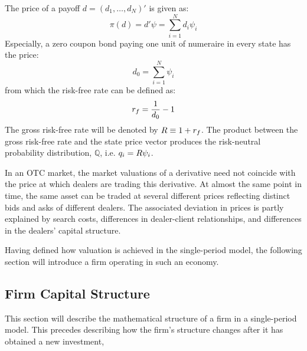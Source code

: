 \documentclass[main.tex]{subfiles}
\begin{document}
        The price of a payoff $d=\left(d_{1}, \dots, d_{N}\right)'$ is given as:
            \begin{equation*}
                \pi(d) = d'\psi = \sum_{i=1}^{N} d_{i}\psi_{i}
            \end{equation*}
        Especially, a zero coupon bond paying one unit of numeraire in every state has the price:
            \begin{equation*}
                d_{0} = \sum_{i=1}^{N} \psi_{i}
            \end{equation*}
        from which the risk-free rate can be defined as:
            \begin{equation*}
                r_{f} = \frac{1}{d_{0}} - 1
            \end{equation*}
        The gross risk-free rate will be denoted by $R \equiv 1 + r_{f}$.
        The product between the gross risk-free rate and the state price vector produces the risk-neutral probability distribution, $\mathbb{Q}$, i.e. $q_{i} = R\psi_{i}$.

        In an OTC market, the market valuations of a derivative need not coincide with the price at which dealers are trading this derivative.
        At almost the same point in time, the same asset can be traded at several different prices reflecting distinct bids and asks of different dealers.
        The associated deviation in prices is partly explained by search costs, differences in dealer-client relationships, and differences in the dealers' capital structure.

        Having defined how valuation is achieved in the single-period model,
        the following section will introduce a firm operating in such an economy.

    \subsection{Firm Capital Structure}
        This section will describe the mathematical structure of a firm in a single-period model.
        This precedes describing how the firm's structure changes after it has obtained a new investment,
        
\end{document}
